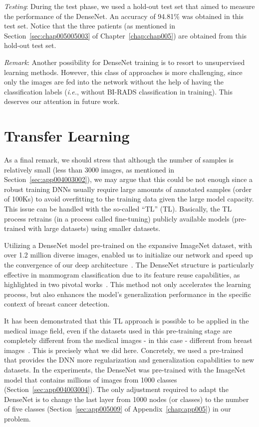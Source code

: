 \noindent
{\it Testing}:
During the test phase, we used a hold-out test set that aimed to measure  the performance of the DenseNet.
An accuracy of 94.81\% was obtained in this test set. 
Notice that the three patients (as mentioned in Section~\ref{sec:chap005005003} of Chapter~\ref{chap:chap005}) are obtained from this hold-out test set.

\vspace{2mm}

\noindent
{\it Remark}: 
Another possibility for DenseNet training is to resort to unsupervised learning  methods.
However, this class of approaches is more challenging, since only the images are fed into the network without the help of having the classification labels ({\it i.e.}, without \ac{BI-RADS} classification in training).
This deserves our attention in future work.

\section{Transfer Learning}
\label{sec:app004005}

As a final remark, we should stress that although the  number of samples is relatively small (less than 3000 images, as mentioned in Section~\ref{sec:app004003002}), we may argue that this could be not enough since a robust training \acp{DNN} usually require large amounts of annotated samples (order of 100Ks) to avoid overfitting to the training data given the large model capacity.
This issue can be handled with the so-called ``\acl{TL}'' (\acs{TL}).
Basically, the \acs{TL} process retrains (in a process called fine-tuning) publicly available models (pre-trained with large datasets) using smaller datasets.

Utilizing a DenseNet model pre-trained on the expansive ImageNet dataset, with over 1.2 million diverse images, enabled us to initialize our network and speed up the convergence of our deep architecture~\cite{8515234}.
The DenseNet structure is particularly effective in mammogram classification due to its feature reuse capabilities, as highlighted in two pivotal works~\cite{10.1007/978-3-030-88163-4_16, 10.1007/978-3-030-47679-3_23}.
This method not only accelerates the learning process, but also enhances the model's generalization performance in the specific context of breast cancer detection.

It has been demonstrated that this \ac{TL} approach is possible to be applied in the medical image field, even if the datasets used in this pre-training stage are completely different from the medical images - in this case - different from breast images~\cite{8032490}.
This is precisely what we did here.
Concretely, we used a pre-trained that provides the \ac{DNN} more regularization and generalization capabilities to new datasets.
In the experiments, the DenseNet was pre-trained with the ImageNet model that contains millions of images from 1000 classes (Section~\ref{sec:app004003004}).
The only adjustment required  to adapt the DenseNet is to change the last layer from 1000 nodes (or classes) to the number of five classes (Section~\ref{sec:app005009} of Appendix~\ref{chap:app005}) in our problem.

